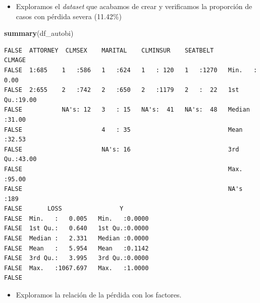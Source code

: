 \documentclass[]{book}
\newenvironment{Shaded}{\begin{snugshade}}{\end{snugshade}}
\newcommand{\DecValTok}[1]{\textcolor[rgb]{0.00,0.00,0.81}{#1}}
\newcommand{\KeywordTok}[1]{\textcolor[rgb]{0.13,0.29,0.53}{\textbf{#1}}}
\newcommand{\NormalTok}[1]{#1}
\newcommand{\OperatorTok}[1]{\textcolor[rgb]{0.81,0.36,0.00}{\textbf{#1}}}
\newcommand{\StringTok}[1]{\textcolor[rgb]{0.31,0.60,0.02}{#1}}
\providecommand{\tightlist}{%
  \setlength{\itemsep}{0pt}\setlength{\parskip}{0pt}}
\begin{document}
\begin{Shaded}
\end{Shaded}

\begin{itemize}
\tightlist
\item
  Exploramos el \emph{dataset} que acabamos de crear y verificamos la proporción de casos con pérdida severa (11.42\%)
\end{itemize}

\begin{Shaded}
\begin{Highlighting}[]
\KeywordTok{summary}\NormalTok{(df_autobi)}
\end{Highlighting}
\end{Shaded}

\begin{verbatim}
FALSE  ATTORNEY  CLMSEX    MARITAL    CLMINSUR    SEATBELT        CLMAGE     
FALSE  1:685    1   :586   1   :624   1   : 120   1   :1270   Min.   : 0.00  
FALSE  2:655    2   :742   2   :650   2   :1179   2   :  22   1st Qu.:19.00  
FALSE           NA's: 12   3   : 15   NA's:  41   NA's:  48   Median :31.00  
FALSE                      4   : 35                           Mean   :32.53  
FALSE                      NA's: 16                           3rd Qu.:43.00  
FALSE                                                         Max.   :95.00  
FALSE                                                         NA's   :189    
FALSE       LOSS                Y         
FALSE  Min.   :   0.005   Min.   :0.0000  
FALSE  1st Qu.:   0.640   1st Qu.:0.0000  
FALSE  Median :   2.331   Median :0.0000  
FALSE  Mean   :   5.954   Mean   :0.1142  
FALSE  3rd Qu.:   3.995   3rd Qu.:0.0000  
FALSE  Max.   :1067.697   Max.   :1.0000  
FALSE 
\end{verbatim}

\begin{itemize}
\tightlist
\item
  Exploramos la relación de la pérdida con los factores.
\end{itemize}
\end{document}
